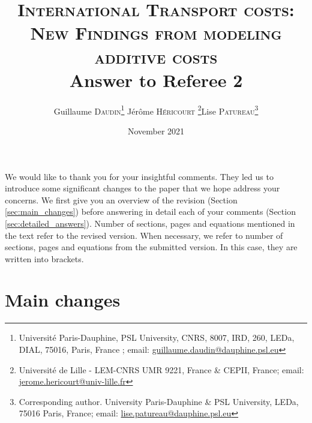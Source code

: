 \documentclass[a4paper,11pt]{article}
\begin{document}
\title{\textsc{International Transport costs:\\New Findings from modeling additive costs} \\
Answer to Referee 2}

\author{Guillaume \textsc{Daudin}\thanks{%
Université Paris-Dauphine, PSL University, CNRS, 8007, IRD, 260, LEDa, DIAL, 75016, Paris, France ; email: \url{guillaume.daudin@dauphine.psl.eu}}  \qquad J\'{e}r\^{o}me \textsc{H\'{e}ricourt} \thanks{Universit\'{e} de Lille - LEM-CNRS UMR 9221, France \& CEPII, France; email: \url{jerome.hericourt@univ-lille.fr}}\qquad Lise \textsc{Patureau}\thanks{Corresponding author.
University Paris-Dauphine \& PSL University, LEDa, 75016 Paris, France;  email: \url{lise.patureau@dauphine.psl.eu} } }


\date{November 2021}
 \maketitle
\bigskip

We would like to thank you for your insightful comments. They led us to introduce some
significant changes to the paper that we hope address your concerns. We first give you an overview
of the revision (Section \ref{sec:main_changes}) before answering in detail each of your comments (Section \ref{sec:detailed_answers}). Number of sections, pages and equations mentioned in the text refer to the revised version. When necessary, we refer to number of sections, pages and equations from the submitted version. In this case, they are written into brackets.

\section{Main changes \label{sec:main_changes}}
\end{document}
